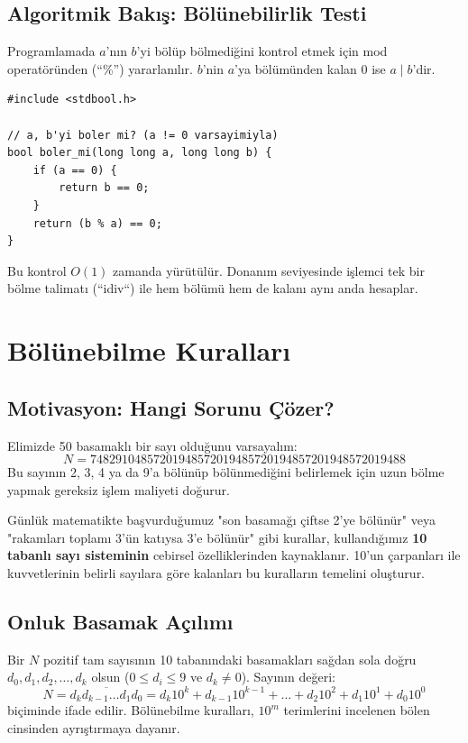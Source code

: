 \subsection{Algoritmik Bakış: Bölünebilirlik Testi}

Programlamada $a$'nın $b$'yi bölüp bölmediğini kontrol etmek için mod operatöründen (``\%'') yararlanılır. $b$'nin $a$'ya bölümünden kalan 0 ise $a \mid b$'dir.

\begin{lstlisting}[language=CTemel]
#include <stdbool.h>

// a, b'yi boler mi? (a != 0 varsayimiyla)
bool boler_mi(long long a, long long b) {
    if (a == 0) {
        return b == 0;
    }
    return (b % a) == 0;
}
\end{lstlisting}

Bu kontrol $O(1)$ zamanda yürütülür. Donanım seviyesinde işlemci tek bir bölme talimatı (``idiv``) ile hem bölümü hem de kalanı aynı anda hesaplar.

\section{Bölünebilme Kuralları}

\subsection{Motivasyon: Hangi Sorunu Çözer?}
Elimizde 50 basamaklı bir sayı olduğunu varsayalım:
\[
N = 74829104857201948572019485720194857201948572019488
\]
Bu sayının 2, 3, 4 ya da 9'a bölünüp bölünmediğini belirlemek için uzun bölme yapmak gereksiz işlem maliyeti doğurur. 

Günlük matematikte başvurduğumuz "son basamağı çiftse 2'ye bölünür" veya "rakamları toplamı 3'ün katıysa 3'e bölünür" gibi kurallar, kullandığımız \textbf{10 tabanlı sayı sisteminin} cebirsel özelliklerinden kaynaklanır. 10'un çarpanları ile kuvvetlerinin belirli sayılara göre kalanları bu kuralların temelini oluşturur.

\subsection{Onluk Basamak Açılımı}
Bir $N$ pozitif tam sayısının 10 tabanındaki basamakları sağdan sola doğru $d_0, d_1, d_2, \dots, d_k$ olsun ($0 \le d_i \le 9$ ve $d_k \neq 0$). Sayının değeri:
\[
N = \overline{d_k d_{k-1} \dots d_1 d_0} = d_k 10^k + d_{k-1} 10^{k-1} + \dots + d_2 10^2 + d_1 10^1 + d_0 10^0
\]
biçiminde ifade edilir. Bölünebilme kuralları, $10^m$ terimlerini incelenen bölen cinsinden ayrıştırmaya dayanır.

